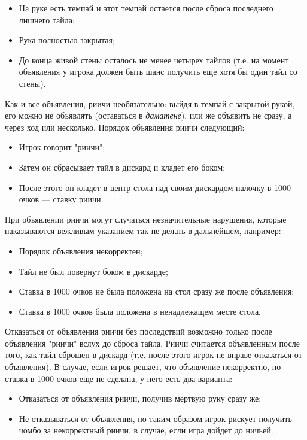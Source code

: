 \begin{itemize}
	\item На руке есть темпай и этот темпай остается после сброса последнего лишнего тайла;
	\item Рука полностью закрытая;
	\item До конца живой стены осталось не менее четырех тайлов (т.е. на момент объявления у игрока должен быть шанс получить еще хотя бы один тайл со стены).
\end{itemize}

Как и все объявления, риичи необязательно: выйдя в темпай с закрытой рукой, его можно не объявлять (оставаться в \textit{даматене}), или же объявить не сразу, а через ход или несколько. Порядок объявления риичи следующий:

\begin{itemize}
	\item Игрок говорит "риичи";
	\item Затем он сбрасывает тайл в дискард и кладет его боком;
	\item После этого он кладет в центр стола над своим дискардом палочку в 1000 очков --- ставку риичи.
\end{itemize}

При объявлении риичи могут случаться незначительные нарушения, которые наказываются вежливым указанием так не делать в дальнейшем, например:
\begin{itemize}
	\item Порядок объявления некорректен;
	\item Тайл не был повернут боком в дискарде;
	\item Ставка в 1000 очков не была положена на стол сразу же после объявления;
	\item Ставка в 1000 очков была положена в ненадлежащем месте стола.
\end{itemize}

Отказаться от объявления риичи без последствий возможно только после объявления "риичи" вслух до сброса тайла. Риичи считается объявленным после того, как тайл сброшен в дискард (т.е. после этого игрок не вправе отказаться от объявления). В случае, если игрок решает, что объявление некорректно, но ставка в 1000 очков еще не сделана, у него есть два варианта:

\begin{itemize}
	\item Отказаться от объявления риичи, получив мертвую руку сразу же;
	\item Не отказываться от объявления, но таким образом игрок рискует получить чомбо за некорректный риичи, в случае, если игра дойдет до ничьей.
\end{itemize}

